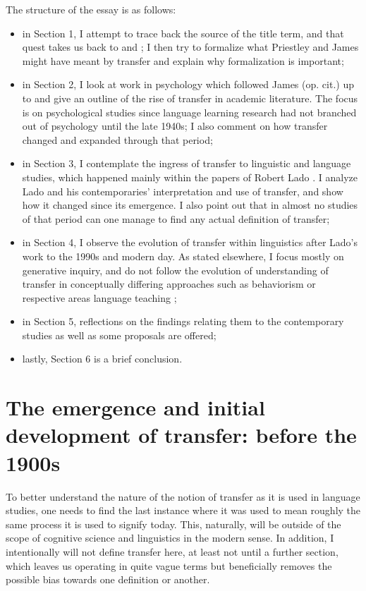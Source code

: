\documentclass{article}
\begin{document}
The structure of the essay is as follows:

\begin{itemize}
    \item in Section 1, I attempt to trace back the source of the title term, and that quest takes us back to \cite{priestley_hartleys_1790} and \cite{james_principles_1890-1}; I then try to formalize what Priestley and James might have meant by transfer and explain why formalization is important;
    \item in Section 2, I look at work in psychology which followed James (op. cit.) up to \cite{lado_relation_1949} and give an outline of the rise of transfer in academic literature. The focus is on psychological studies since language learning research had not branched out of psychology until the late 1940s; I also comment on how transfer changed and expanded through that period;
    \item in Section 3, I contemplate the ingress of transfer to linguistic and language studies, which happened mainly within the papers of Robert Lado \citep[including but not limited to][]{lado_relation_1949, lado_survey_1950, lado_testing_1951, lado_comparison_1956, lado_linguistics_1957, lado_sentence_1957}. I analyze Lado and his contemporaries’ interpretation and use of transfer, and show how it changed since its emergence. I also point out that in almost no studies of that period can one manage to find any actual definition of transfer;
    \item in Section 4, I observe the evolution of transfer within linguistics after Lado’s work to the 1990s and modern day. As stated elsewhere, I focus mostly on generative inquiry, and do not follow the evolution of understanding of transfer in conceptually differing approaches such as behaviorism or respective areas language teaching \citep[along the lines of][]{tomasello_feedback_1989}; 
    \item in Section 5, reflections on the findings relating them to the contemporary studies as well as some proposals are offered;
    \item lastly, Section 6 is a brief conclusion.
\end{itemize}

\section{The emergence and initial development of transfer: before the 1900s}

To better understand the nature of the notion of transfer as it is used in language studies, one needs to find the last instance where it was used to mean roughly the same process it is used to signify today. This, naturally, will be outside of the scope of cognitive science and linguistics in the modern sense. In addition, I intentionally will not define transfer here, at least not until a further section, which leaves us operating in quite vague terms but beneficially removes the possible bias towards one definition or another.
\end{document}
